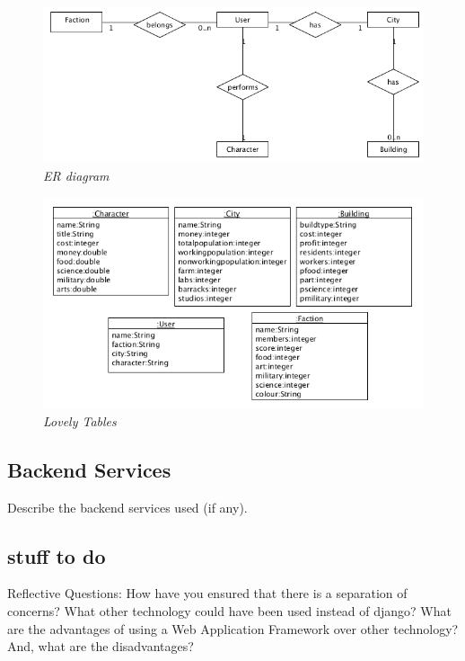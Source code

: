 \documentclass{sig-alt-release2}
\begin{document}
\begin{figure}[!htbp]
  \caption{\textit{ER diagram}}
  \begin{center}
		\includegraphics[scale=0.40]{img/er.png}
  \end{center}
\end{figure}

\begin{figure}[!htbp]
  \caption{\textit{Lovely Tables}}
  \begin{center}
		\includegraphics[scale=0.40]{img/tables.png}
  \end{center}
\end{figure}

\subsection{Backend Services}

Describe the backend services used (if any).

\subsection{stuff to do} 

Reflective Questions: 
How have you ensured that there is a separation of concerns? 
What other technology could have been used instead of django? 
What are the advantages of using a Web Application Framework over other technology? 
And, what are the disadvantages?
\end{document}
